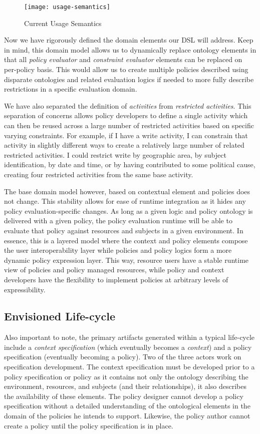 \begin{figure}[!t]
\centering
\texttt{[image: usage-semantics]}
\caption{Current Usage Semantics}
\label{fig:model:usage-semantics}
\end{figure}

Now we have rigorously defined the domain elements our DSL will address.  Keep in mind, this domain model allows us to dynamically replace ontology elements in that all \emph{policy evaluator} and \emph{constraint evaluator} elements can be replaced on per-policy basis.  This would allow us to create multiple policies described using disparate ontologies and related evaluation logics if needed to more fully describe restrictions in a specific evaluation domain.

We have also separated the definition of \emph{activities} from \emph{restricted activities}.  This separation of concerns allows policy developers to define a single activity which can then be reused across a large number of restricted activities based on specific varying constraints.  For example, if I have a write activity, I can constrain that activity in slightly different ways to create a relatively large number of related restricted activities.  I could restrict write by geographic area, by subject identification, by date and time, or by having contributed to some political cause, creating four restricted activities from the same base activity.

The base domain model however, based on contextual element and policies does not change.  This stability allows for ease of runtime integration as it hides any policy evaluation-specific changes.  As long as a given logic and policy ontology is delivered with a given policy, the policy evaluation runtime will be able to evaluate that policy against resources and subjects in a given environment.  In essence, this is a layered model where the context and policy elements compose the user interoperability layer while policies and policy logics form a more dynamic policy expression layer.  This way, resource users have a stable runtime view of policies and policy managed resources, while policy and context developers have the flexibility to implement policies at arbitrary levels of expressibility.

\subsection{Envisioned Life-cycle}
Also important to note, the primary artifacts generated within a typical life-cycle include a \emph{context specification} (which eventually becomes a \emph{context}) and a policy specification (eventually becoming a policy).  Two of the three actors work on specification development.  The context specification must be developed prior to a policy specification or policy as it contains not only the ontology describing the environment, resources, and subjects (and their relationships), it also describes the availability of these elements.  The policy designer cannot develop a policy specification without a detailed understanding of the ontological elements in the domain of the policies he intends to support.  Likewise, the policy author cannot create a policy until the policy specification is in place.

